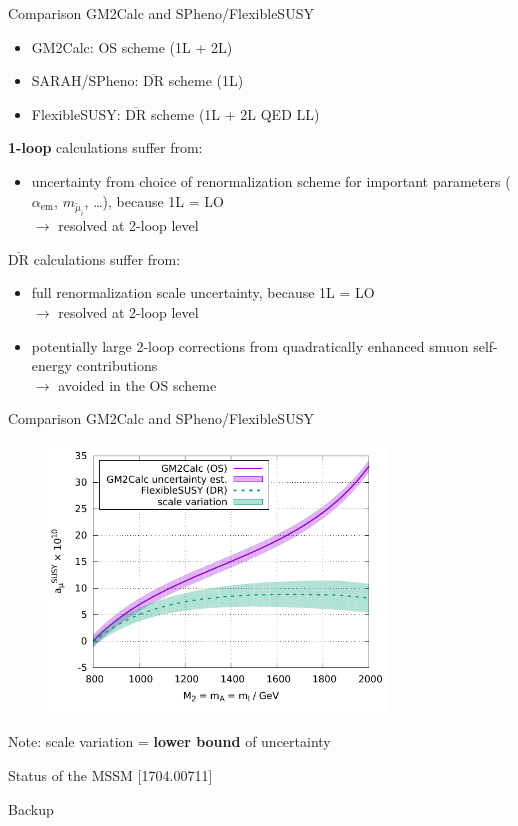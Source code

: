 \documentclass[hyperref={pdfpagelabels=false},ngerman]{beamer}
\renewcommand{\emph}{\textbf}
\newcommand{\DRbar}{\ensuremath{\overline{\text{DR}}}\xspace}
\begin{document}
\begin{frame}{Comparison GM2Calc and SPheno/FlexibleSUSY}
  \begin{itemize}
  \item GM2Calc: OS scheme (1L + 2L)
  \item SARAH/SPheno: \DRbar scheme (1L)
  \item FlexibleSUSY: \DRbar scheme (1L + 2L QED LL)
  \end{itemize}
  \vspace{1em}
  \emph{1-loop} calculations suffer from:
  \begin{itemize}
  \item uncertainty from choice of renormalization scheme for
    important parameters ($\alpha_{\text{em}}$, $m_{\tilde{\mu}_i}$,
    \ldots), because 1L = LO\\
    $\rightarrow$ resolved at 2-loop level
  \end{itemize}
  \vspace{1em}
  \emph{\DRbar} calculations suffer from:
  \begin{itemize}
  \item full renormalization scale uncertainty, because 1L = LO\\
    $\rightarrow$ resolved at 2-loop level
  \item potentially large 2-loop corrections from quadratically
    enhanced smuon self-energy contributions\\
    $\rightarrow$ avoided in the OS scheme
  \end{itemize}
\end{frame}

\begin{frame}{Comparison GM2Calc and SPheno/FlexibleSUSY}
  \begin{figure}
    \centering
    \includegraphics[width=0.8\textwidth]{plots/OS-vs-DR}
  \end{figure}
  Note: scale variation = \emph{lower bound} of uncertainty
\end{frame}

\begin{frame}{Status of the MSSM}
  [1704.00711]
\end{frame}


\begin{frame}[noframenumbering]
  \begin{center}
    \Huge Backup
  \end{center}
\end{frame}
\end{document}
